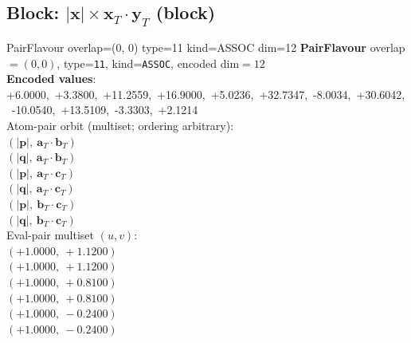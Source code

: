 \documentclass[a4paper,11pt]{article}
\newcommand{\vc}[1]{\ensuremath{\mathbf{#1}}}
\newcommand{\dnfagmiihhiejm}[1]{|\vc{#1}|}
\newcommand{\fpbeomcfokjooi}[2]{\mathbf{#1}_T \cdot \mathbf{#2}_T}
\begin{document}
\subsection{Block: $\dnfagmiihhiejm{x} \times \fpbeomcfokjooi{x}{y}$  (block)}
    PairFlavour  overlap=(0, 0)  type=11  kind=ASSOC  dim=12
\textbf{PairFlavour} overlap$=(0, 0)$, type=\texttt{11}, kind=\texttt{ASSOC}, encoded dim$=12$\\
\textbf{      Encoded values}: +6.0000,\ +3.3800,\ +11.2559,\ +16.9000,\ +5.0236,\ +32.7347,\ -8.0034,\ +30.6042,\ -10.0540,\ +13.5109,\ -3.3303,\ +2.1214\\
\quad Atom-pair orbit (multiset; ordering arbitrary):\\
$(\dnfagmiihhiejm{p},\ \fpbeomcfokjooi{a}{b})$\\
$(\dnfagmiihhiejm{q},\ \fpbeomcfokjooi{a}{b})$\\
$(\dnfagmiihhiejm{p},\ \fpbeomcfokjooi{a}{c})$\\
$(\dnfagmiihhiejm{q},\ \fpbeomcfokjooi{a}{c})$\\
$(\dnfagmiihhiejm{p},\ \fpbeomcfokjooi{b}{c})$\\
$(\dnfagmiihhiejm{q},\ \fpbeomcfokjooi{b}{c})$\\
\quad Eval-pair multiset $(u, v)$:\\
$(+1.0000,\ +1.1200)$\\
$(+1.0000,\ +1.1200)$\\
$(+1.0000,\ +0.8100)$\\
$(+1.0000,\ +0.8100)$\\
$(+1.0000,\ -0.2400)$\\
$(+1.0000,\ -0.2400)$\\
\end{document}
